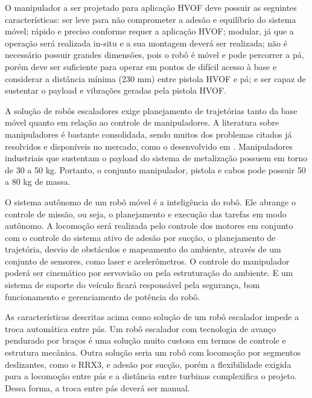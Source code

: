 O manipulador a ser projetado para aplicação HVOF deve possuir as seguintes
características: ser leve para não comprometer a adesão e equilíbrio do sistema
móvel; rápido e preciso conforme requer a aplicação HVOF; modular, já
que a operação será realizada in-situ e a sua montagem deverá ser realizada;
não é necessário possuir grandes dimensões, pois o robô é móvel e pode
percorrer a pá, porém deve ser suficiente para operar em pontos de
difícil acesso à base e considerar a distância mínima (230 mm) entre pistola
HVOF e pá; e ser capaz de sustentar o payload e vibrações geradas pela
pistola HVOF. 

A solução de robôs escaladores exige planejamento de trajetórias tanto da base
móvel quanto em relação ao controle de manipuladores. A literatura sobre
manipuladores é bastante consolidada, sendo muitos dos problemas citados já
resolvidos e disponíveis no mercado, como o desenvolvido em
\cite{manzdevelopment}. Manipuladores industriais que sustentam o payload do
sistema de metalização possuem em torno de 30 a 50 kg. Portanto, o conjunto
manipulador, pistola e cabos pode possuir 50 a 80 kg de massa.


O sistema autônomo de um robô móvel é a inteligência do robô. Ele abrange o
controle de missão, ou seja, o planejamento e execução das tarefas em modo
autônomo. A locomoção será realizada pelo controle dos motores em conjunto com o
controle do sistema ativo de adesão por sucção, o planejamento de trajetória, desvio de
obstáculos e mapeamento do ambiente, através de um conjunto de sensores, como
laser e acelerômetros. O controle do manipulador poderá ser cinemático por
servovisão ou pela estruturação do ambiente. E um sistema de suporte do veículo
ficará responsável pela segurança, bom funcionamento e gerenciamento de potência
do robô.

As características descritas acima como solução de um robô escalador impede a
troca automática entre pás. Um robô escalador com tecnologia de avanço pendurado
por braços é uma solução muito custosa em termos de controle e estrutura
mecânica. Outra solução seria um robô com locomoção por segmentos deslizantes,
como o RRX3, e adesão por sucção, porém a flexibilidade exigida para a locomoção
entre pás e a distância entre turbinas complexifica o projeto. Dessa forma, a
troca entre pás deverá ser manual.

